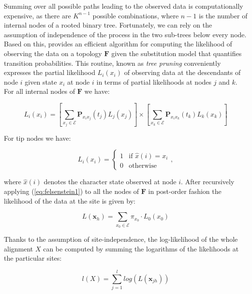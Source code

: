 Summing over all possible paths leading to the observed data is computationally expensive, as there are  $K^{n-1}$ possible combinations, where $n-1$ is the number of internal nodes of a rooted binary tree.
Fortunately, we can rely on the assumption of independence of the process in the two sub-trees below every node.
Based on this, \citet{Felsenstein1981} provides an efficient algorithm for computing the likelihood of observing the data on a topology $\mathbf{F}$ given the substitution model that quantifies transition probabilities.
This routine, known as \emph{tree pruning} conveniently expresses the partial likelihood $L_{i}(x_{i})$ of observing data at the descendants of node $i$ given state $x_{i}$ at node $i$ in terms of partial likelihoods at nodes $j$ and $k$.
For all internal nodes of $\mathbf{F}$ we have:

\begin{equation}
L_{i}(x_{i})=\left[\underset{x_{j}\in \mathcal{E}}{\sum}\mathbf{P}_{x_{i}x_{j}}(t_{j})L_{j}(x_{j})\right]\times\left[\underset{x_{k}\in \mathcal{E}}{\sum}\mathbf{P}_{x_{i}x_{k}}(t_{k})L_{k}(x_{k})\right]
\label{eq:felsenstein1}
\end{equation}

\noindent
For tip nodes we have:

\begin{equation}
L_{i}(x_{i})=\begin{cases}
1 & \text{if }\hat{x}(i)=x_{i}\\
0 & \text{otherwise}
\end{cases},
\label{eq:felsenstein2}
\end{equation}

\noindent
where $\hat{x}(i)$ denotes the character state observed at node $i$.
After recursively applying (\ref{eq:felsenstein1}) to all the nodes of $\mathbf{F}$ in post-order fashion the likelihood of the data at the site is given by:

\begin{equation}
L(\mathbf{x}_{h})=\underset{x_{0}\in\mathcal{E}}{\sum}\pi_{x_{0}}\cdot L_{0}(x_{0})
\label{eq:felsenstein3}
\end{equation}

\noindent
Thanks to the assumption of site-independence, the log-likelihood of the whole alignment $X$ can be computed by summing the logarithms of the likelihoods at the particular sites:

\begin{equation}
l(X)=\underset{j=1}{\overset{l}{\sum}}log\left(L(\mathbf{x}_{jh})\right)
\label{eq:loglikelihood}
\end{equation}

